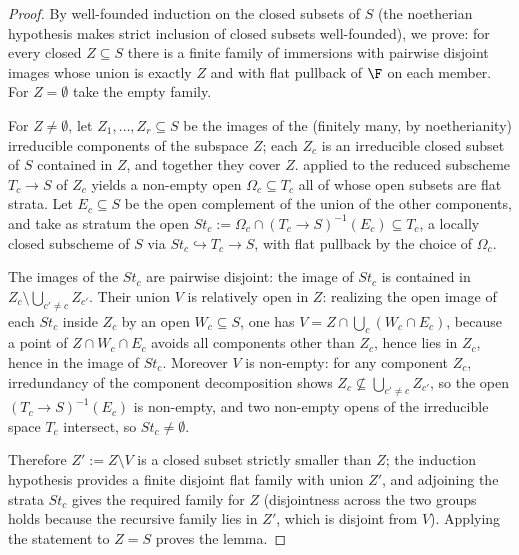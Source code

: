 \begin{proof}
  \leanok
  By well-founded induction on the closed subsets of \(S\) (the noetherian
  hypothesis makes strict inclusion of closed subsets well-founded), we prove:
  for every closed \(Z \subseteq S\) there is a finite family of immersions
  with pairwise disjoint images whose union is exactly \(Z\) and with flat
  pullback of \(\F\) on each member.  For \(Z = \emptyset\) take the empty
  family.

  For \(Z \neq \emptyset\), let \(Z_1, \dots, Z_r \subseteq S\) be the images
  of the (finitely many, by noetherianity) irreducible components of the
  subspace \(Z\); each \(Z_c\) is an irreducible closed subset of \(S\)
  contained in \(Z\), and together they cover \(Z\).
   applied to the reduced subscheme
  \(T_c \to S\) of \(Z_c\) yields a non-empty open \(\Omega_c \subseteq T_c\)
  all of whose open subsets are flat strata.  Let
  \(E_c \subseteq S\) be the open complement of the union of the other
  components, and take as stratum the open
  \(\mathit{St}_c := \Omega_c \cap (T_c \to S)^{-1}(E_c) \subseteq T_c\),
  a locally closed subscheme of \(S\) via
  \(\mathit{St}_c \hookrightarrow T_c \to S\), with flat pullback by the
  choice of \(\Omega_c\).

  The images of the \(\mathit{St}_c\) are pairwise disjoint: the image of
  \(\mathit{St}_c\) is contained in \(Z_c \setminus \bigcup_{c' \neq c} Z_{c'}\).
  Their union \(V\) is relatively open in \(Z\): realizing the open image of
  each \(\mathit{St}_c\) inside \(Z_c\) by an open \(W_c \subseteq S\), one has
  \(V = Z \cap \bigcup_c (W_c \cap E_c)\), because a point of
  \(Z \cap W_c \cap E_c\) avoids all components other than \(Z_c\), hence lies
  in \(Z_c\), hence in the image of \(\mathit{St}_c\).  Moreover \(V\) is
  non-empty: for any component \(Z_{c}\), irredundancy of the component
  decomposition shows \(Z_c \not\subseteq \bigcup_{c' \neq c} Z_{c'}\), so the
  open \((T_c \to S)^{-1}(E_c)\) is non-empty, and two non-empty opens of the
  irreducible space \(T_c\) intersect, so \(\mathit{St}_c \neq \emptyset\).

  Therefore \(Z' := Z \setminus V\) is a closed subset strictly smaller than
  \(Z\); the induction hypothesis provides a finite disjoint flat family with
  union \(Z'\), and adjoining the strata \(\mathit{St}_c\) gives the required
  family for \(Z\) (disjointness across the two groups holds because the
  recursive family lies in \(Z'\), which is disjoint from \(V\)).  Applying
  the statement to \(Z = S\) proves the lemma.
\end{proof}

